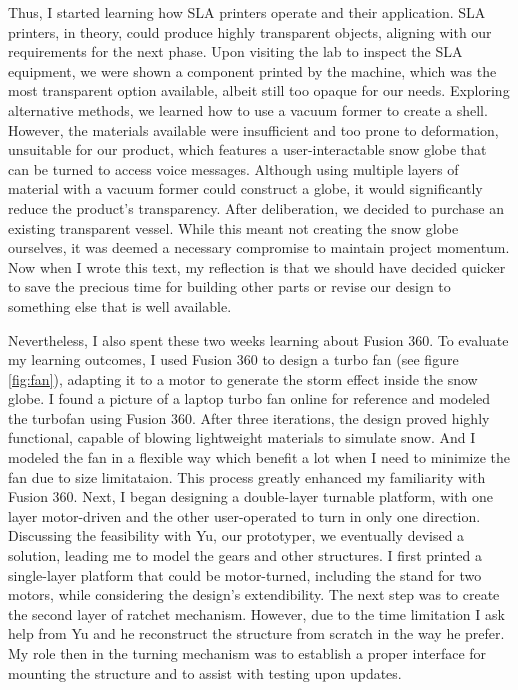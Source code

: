 Thus, I started learning how SLA printers operate and their application. SLA printers, in theory, could produce highly transparent objects, aligning with our requirements for the next phase. Upon visiting the lab to inspect the SLA equipment, we were shown a component printed by the machine, which was the most transparent option available, albeit still too opaque for our needs. Exploring alternative methods, we learned how to use a vacuum former to create a shell. However, the materials available were insufficient and too prone to deformation, unsuitable for our product, which features a user-interactable snow globe that can be turned to access voice messages. Although using multiple layers of material with a vacuum former could construct a globe, it would significantly reduce the product's transparency. After deliberation, we decided to purchase an existing transparent vessel. While this meant not creating the snow globe ourselves, it was deemed a necessary compromise to maintain project momentum. 
Now when I wrote this text, my reflection is that we should have decided quicker to save the precious time for building other parts or revise our design to something else that is well available.

Nevertheless, I also spent these two weeks learning about Fusion 360.
To evaluate my learning outcomes, I used Fusion 360 to design a turbo fan (see figure \ref{fig:fan}), adapting it to a motor to generate the storm effect inside the snow globe. I found a picture of a laptop turbo fan online for reference and modeled the turbofan using Fusion 360. After three iterations, the design proved highly functional, capable of blowing lightweight materials to simulate snow. And I modeled the fan in a flexible way which benefit a lot when I need to minimize the fan due to size limitataion. This process greatly enhanced my familiarity with Fusion 360. Next, I began designing a double-layer turnable platform, with one layer motor-driven and the other user-operated to turn in only one direction. Discussing the feasibility with Yu, our prototyper, we eventually devised a solution, leading me to model the gears and other structures. I first printed a single-layer platform that could be motor-turned, including the stand for two motors, while considering the design's extendibility. The next step was to create the second layer of ratchet mechanism. However, due to the time limitation I ask help from Yu and he reconstruct the structure from scratch in the way he prefer. 
My role then in the turning mechanism was to establish a proper interface for mounting the structure and to assist with testing upon updates.

